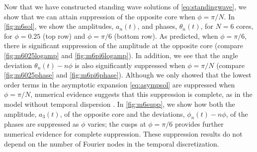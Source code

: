 \documentclass[11pt,reqno]{amsart}
\begin{document}
Now that we have constructed standing wave solutions of \cref{eq:standingwave}, we show that we can attain suppression of the opposite core when $\phi=\pi/N$. In \cref{fig:m6sol}, we show the amplitudes, $a_n(t)$, and phases, $\theta_n(t)$, for $N=6$ cores, for $\phi=0.25$ (top row) and $\phi=\pi/6$ (bottom row). As predicted, when $\phi=\pi/6$, there is significant suppression of the amplitude at the opposite core (compare \cref{fig:m6025logamp} and \cref{fig:m6pi6logamp}). In addition, we see that the angle deviation $\theta_n(t) - n \phi$ is also significantly suppressed when $\phi=\pi/N$ (compare \cref{fig:m6025phase} and \cref{fig:m6pi6phase}). Although we only showed that the lowest order terms in the asymptotic expansion \cref{eq:asympsol} are suppressed when $\phi=\pi/N$, numerical evidence suggests that this suppression is complete, as in the model without temporal dispersion \cite{parker2021}. In \cref{fig:m6supp}, we show how both the amplitude, $a_3(t)$, of the opposite core and the deviations, $\phi_n(t) - n \phi$, of the phases are suppressed as $\phi$ varies; the cusps at $\phi=\pi/6$ provides further numerical evidence for complete suppression. These suppression results do not depend on the number of Fourier nodes in the temporal discretization.
\end{document}
